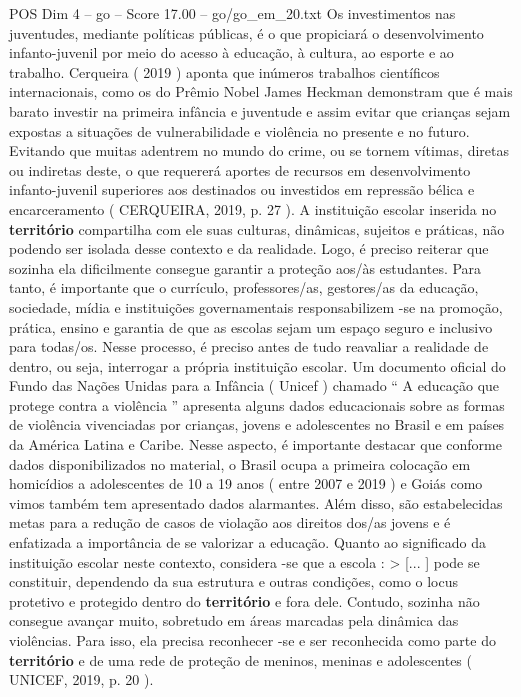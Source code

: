 \begin{textsample}{POS Dim 4 – go – Score 17.00 – go/go\_em\_20.txt}
Os investimentos nas juventudes, mediante políticas públicas, é o que propiciará o desenvolvimento infanto-juvenil por meio do acesso à educação, à cultura, ao esporte e ao trabalho.
Cerqueira ( 2019 ) aponta que inúmeros trabalhos científicos internacionais, como os do Prêmio Nobel James Heckman demonstram que é mais barato investir na primeira infância e juventude e assim evitar que crianças sejam expostas a situações de vulnerabilidade e violência no presente e no futuro.
Evitando que muitas adentrem no mundo do crime, ou se tornem vítimas, diretas ou indiretas deste, o que requererá aportes de recursos em desenvolvimento infanto-juvenil superiores aos destinados ou investidos em repressão bélica e encarceramento ( CERQUEIRA, 2019, p. 27 ).
A instituição escolar inserida no \textbf{território} compartilha com ele suas culturas, dinâmicas, sujeitos e práticas, não podendo ser isolada desse contexto e da realidade.
Logo, é preciso reiterar que sozinha ela dificilmente consegue garantir a proteção aos/às estudantes.
Para tanto, é importante que o currículo, professores/as, gestores/as da educação, sociedade, mídia e instituições governamentais responsabilizem -se na promoção, prática, ensino e garantia de que as escolas sejam um espaço seguro e inclusivo para todas/os.
Nesse processo, é preciso antes de tudo reavaliar a realidade de dentro, ou seja, interrogar a própria instituição escolar.
Um documento oficial do Fundo das Nações Unidas para a Infância ( Unicef ) chamado “ A educação que protege contra a violência ” apresenta alguns dados educacionais sobre as formas de violência vivenciadas por crianças, jovens e adolescentes no Brasil e em países da América Latina e Caribe.
Nesse aspecto, é importante destacar que conforme dados disponibilizados no material, o Brasil ocupa a primeira colocação em homicídios a adolescentes de 10 a 19 anos ( entre 2007 e 2019 ) e Goiás como vimos também tem apresentado dados alarmantes.
Além disso, são estabelecidas metas para a redução de casos de violação aos direitos dos/as jovens e é enfatizada a importância de se valorizar a educação.
Quanto ao significado da instituição escolar neste contexto, considera -se que a escola : > [... ] pode se constituir, dependendo da sua estrutura e outras condições, como o locus protetivo e protegido dentro do \textbf{território} e fora dele.
Contudo, sozinha não consegue avançar muito, sobretudo em áreas marcadas pela dinâmica das violências.
Para isso, ela precisa reconhecer -se e ser reconhecida como parte do \textbf{território} e de uma rede de proteção de meninos, meninas e adolescentes ( UNICEF, 2019, p. 20 ).

\end{textsample}
